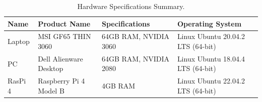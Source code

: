 \begin{table}[]
    \centering
    \begin{tabular}{| l  | l | l | l |} 
        \hline
        Name & Product Name & Specifications & Operating System \\
        \hline        
        Laptop  & MSI GF65 THIN 3060  & 64GB RAM, NVIDIA 3060 & Linux Ubuntu 20.04.2 LTS (64-bit)\\ 
        PC  & Dell Alienware Desktop & 64GB RAM, NVIDIA 2080 & Linux Ubuntu 18.04.4 LTS (64-bit)\\
        RasPi 4  & Raspberry Pi 4 Model B & 4GB RAM &  Linux Ubuntu 22.04.2 LTS (64-bit) \\
        \hline
    \end{tabular}
    \caption{Hardware Specifications Summary.}%
    \label{tab:Hardware_summary}
\end{table}





